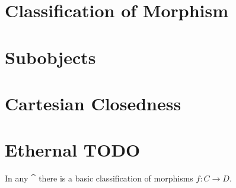 \documentclass[a4paper,12pt,fleqn]{scrartcl}  %
\begin{document}
\begin{appendices}
\section{Classification of Morphism}

\section{Subobjects}


\section{Cartesian Closedness}



\section{Ethernal TODO}
	
	
	In any $\cat$ there is a basic classification of morphisms $f: C \rightarrow D$.
	
	


\end{appendices}
			\nocite{*}
			
			
\end{document}
